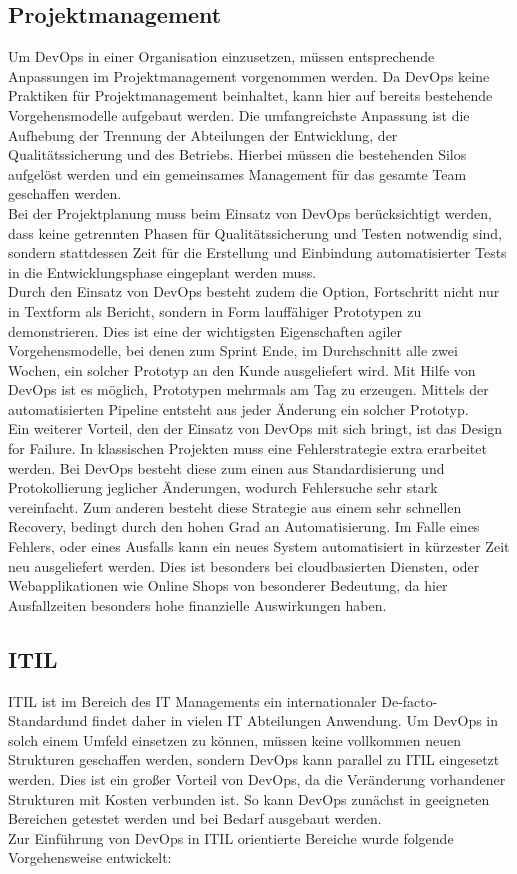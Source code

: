 \subsection{Projektmanagement}
Um DevOps in einer Organisation einzusetzen, müssen entsprechende Anpassungen im Projektmanagement vorgenommen werden. Da DevOps keine Praktiken für Projektmanagement beinhaltet, kann hier auf bereits bestehende Vorgehensmodelle aufgebaut werden. Die umfangreichste Anpassung ist die Aufhebung der Trennung der Abteilungen der Entwicklung, der Qualitätssicherung und des Betriebs. Hierbei müssen die bestehenden Silos aufgelöst werden und ein gemeinsames Management für das gesamte Team geschaffen werden.\\
Bei der Projektplanung muss beim Einsatz von DevOps berücksichtigt werden, dass keine getrennten Phasen für Qualitätssicherung und Testen notwendig sind, sondern stattdessen Zeit für die Erstellung und Einbindung automatisierter Tests in die Entwicklungsphase eingeplant werden muss.\\
Durch den Einsatz von DevOps besteht zudem die Option, Fortschritt nicht nur in Textform als Bericht, sondern in Form lauffähiger Prototypen zu demonstrieren. Dies ist eine der wichtigsten Eigenschaften agiler Vorgehensmodelle, bei denen zum Sprint Ende, im Durchschnitt alle zwei Wochen, ein solcher Prototyp an den Kunde ausgeliefert wird. Mit Hilfe von DevOps ist es möglich, Prototypen mehrmals am Tag zu erzeugen. Mittels der automatisierten Pipeline entsteht aus jeder Änderung ein solcher Prototyp.\\
Ein weiterer Vorteil, den der Einsatz von DevOps mit sich bringt, ist das \glqq Design for Failure\grqq. In klassischen Projekten muss eine Fehlerstrategie extra erarbeitet werden. Bei DevOps besteht diese zum einen aus Standardisierung und Protokollierung jeglicher Änderungen, wodurch Fehlersuche sehr stark vereinfacht. Zum anderen besteht diese Strategie aus einem sehr schnellen Recovery, bedingt durch den hohen Grad an Automatisierung. Im Falle eines Fehlers, oder eines Ausfalls kann ein neues System automatisiert in kürzester Zeit neu ausgeliefert werden. Dies ist besonders bei cloudbasierten Diensten, oder Webapplikationen wie Online Shops von besonderer Bedeutung, da hier Ausfallzeiten besonders hohe finanzielle Auswirkungen haben. \parencite[Vgl.][]{Null:2014}

\subsection{ITIL}
ITIL ist im Bereich des IT Managements ein internationaler \glqq De-facto-Standard\grqq und findet daher in vielen IT Abteilungen Anwendung. Um DevOps in solch einem Umfeld einsetzen zu können, müssen keine vollkommen neuen Strukturen geschaffen werden, sondern DevOps kann parallel zu ITIL eingesetzt werden. Dies ist ein großer Vorteil von DevOps, da die Veränderung vorhandener Strukturen mit Kosten verbunden ist. So kann DevOps zunächst in geeigneten Bereichen getestet werden und bei Bedarf ausgebaut werden.\\
Zur Einführung von DevOps in ITIL orientierte Bereiche wurde folgende Vorgehensweise entwickelt:

